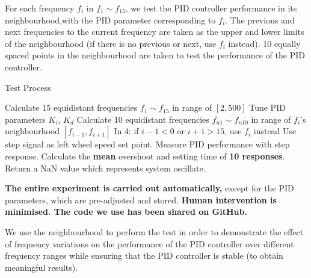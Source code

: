\documentclass[conference]{IEEEtran}
\begin{document}

For each frequency $f_{i}$ in $f_{1}\sim f_{15}$, we test the PID controller performance in its neighbourhood,with the PID parameter corresponding to $f_{i}$. The previous and next frequencies to the current frequency are taken as the upper and lower limits of the neighbourhood (if there is no previous or next, use $f_{i}$ instead). 10 equally spaced points in the neighbourhood are taken to test the performance of the PID controller.

\begin{algorithm}
	\caption{Test Process}\label{TestMethod}
	\begin{algorithmic}[1]
        \State Calculate 15  equidistant frequencies $f_{1}\sim f_{15}$ in range of $[2,500]$
                \State Tune PID parameters $K_{i}$, $K_{d}$
                \State Calculate 10 equidistant frequencies $f_{n1}\sim f_{n10}$ in range of $f_{i}$'s neighbourhood $[f_{i-1},f_{i+1}]$
                \State In 4: if $i-1<0$ or $i+1>15$, use $f_{i}$ instead
				\State Use step signal as left wheel speed set point.
                \State Measure PID performance with step response.
                \State Calculate the \textbf{mean} overshoot and setting time of \textbf{10 responses}.
                 Return a NaN value which represents system oscillate.                
                \EndIf
			\EndFor
		\EndFor
	\end{algorithmic} 
\end{algorithm}

 \textbf{The entire experiment is carried out automatically,} except for the PID parameters, which are pre-adjusted and stored. \textbf{Human intervention is minimised. The code we use has been shared on GitHub.} 
 
We use the neighbourhood to perform the test in order to demonstrate the effect of frequency variations on the performance of the PID controller over different frequency ranges while ensuring that the PID controller is stable (to obtain meaningful results).
\end{document}
